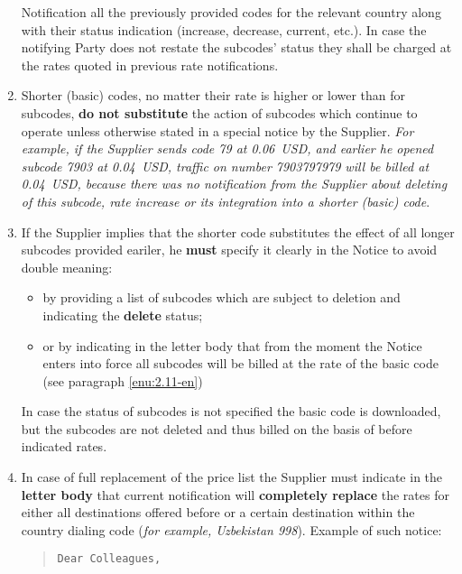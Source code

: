 \begin{Form}
\begin{enumerate}[label=\thesection.\arabic*.]
      Notification all the previously provided codes for the relevant country
      along with their status indication (increase, decrease, current, etc.).
      In case the notifying Party does not restate the subcodes' status they
      shall be charged at the rates quoted in previous rate notifications. 
    \item Shorter (basic) codes, no matter their rate is higher or lower than
      for subcodes, \textbf{do not substitute} the action of subcodes which continue to
      operate unless otherwise stated in a special notice by the Supplier. 
      \textit{For example, if the Supplier sends code 79 at 0.06~USD, and
      earlier he opened subcode 7903 at 0.04~USD, traffic on number
      7903797979 will be billed at 0.04~USD, because there was
      no notification from the Supplier about deleting of this subcode,
      rate increase or its integration into a shorter (basic) code}.
    \item If the Supplier implies that the shorter code substitutes the 
      effect of all longer subcodes provided eariler, he \textbf{must} specify it
      clearly in the Notice to avoid double meaning: 
      \begin{itemize}
      \item by providing a list of subcodes which are subject to deletion and indicating the \textbf{\flqq{}delete\frqq{}} status;
      \item or by indicating in the letter body that from the moment the Notice
        enters into force all subcodes will be billed at the rate of the basic
        code (see paragraph \ref{enu:2.11-en})
      \end{itemize}
      In case the status of subcodes is not specified the basic code is
      downloaded, but the subcodes are not deleted and thus billed on the basis
      of before indicated rates.
    \item  \label{enu:2.11-en}In case of full replacement of the price list the Supplier must
      indicate in the \textbf{letter body} that current notification will \textbf{completely
      replace} the rates for either all destinations offered before or a certain
      destination within the country dialing code (\textit{for example, Uzbekistan 998}).
      Example of such notice: 
    \begin{quote}
      \begin{center}
        \texttt{Dear Colleagues,}
      \end{center}
      \begin{flushleft}

\end{flushleft}
\end{quote}
\end{enumerate}
\end{Form}
